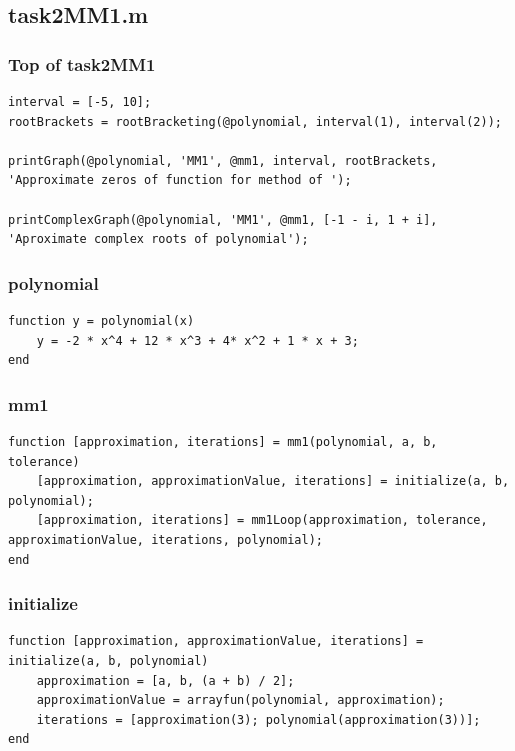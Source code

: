 \subsection{task2MM1.m}

\subsubsection{Top of task2MM1}
\begin{simplechar}
\begin{lstlisting}
interval = [-5, 10];
rootBrackets = rootBracketing(@polynomial, interval(1), interval(2));

printGraph(@polynomial, 'MM1', @mm1, interval, rootBrackets, 'Approximate zeros of function for method of ');

printComplexGraph(@polynomial, 'MM1', @mm1, [-1 - i, 1 + i], 'Aproximate complex roots of polynomial');
\end{lstlisting}
\end{simplechar}

\subsubsection{polynomial}
\begin{simplechar}
\begin{lstlisting}
function y = polynomial(x)
    y = -2 * x^4 + 12 * x^3 + 4* x^2 + 1 * x + 3;
end
\end{lstlisting}
\end{simplechar}

\subsubsection{mm1}
\begin{simplechar}
\begin{lstlisting}
function [approximation, iterations] = mm1(polynomial, a, b, tolerance)
    [approximation, approximationValue, iterations] = initialize(a, b, polynomial);
    [approximation, iterations] = mm1Loop(approximation, tolerance, approximationValue, iterations, polynomial);
end
\end{lstlisting}
\end{simplechar}

\newpage
\subsubsection{initialize}
\begin{simplechar}
\begin{lstlisting}
function [approximation, approximationValue, iterations] = initialize(a, b, polynomial)
    approximation = [a, b, (a + b) / 2];
    approximationValue = arrayfun(polynomial, approximation);
    iterations = [approximation(3); polynomial(approximation(3))];
end
\end{lstlisting}
\end{simplechar}

